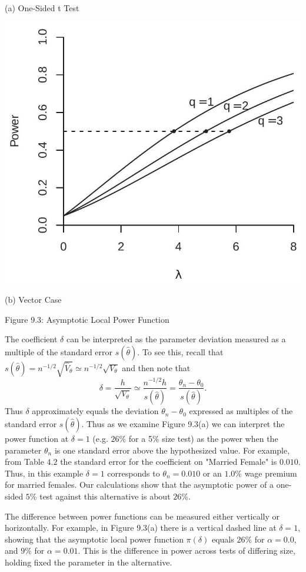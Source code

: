 \documentclass[10pt]{article}
\begin{document}
(a) One-Sided t Test

\includegraphics[max width=\textwidth]{2022_09_17_d22774979aa7978900adg-28(1)}

(b) Vector Case

Figure 9.3: Asymptotic Local Power Function

The coefficient $\delta$ can be interpreted as the parameter deviation measured as a multiple of the standard error $s(\widehat{\theta})$. To see this, recall that $s(\widehat{\theta})=n^{-1 / 2} \sqrt{\widehat{V}_{\theta}} \simeq n^{-1 / 2} \sqrt{V_{\theta}}$ and then note that
$$
\delta=\frac{h}{\sqrt{V_{\theta}}} \simeq \frac{n^{-1 / 2} h}{s(\widehat{\theta})}=\frac{\theta_{n}-\theta_{0}}{s(\widehat{\theta})} .
$$
Thus $\delta$ approximately equals the deviation $\theta_{n}-\theta_{0}$ expressed as multiples of the standard error $s(\widehat{\theta})$. Thus as we examine Figure 9.3(a) we can interpret the power function at $\delta=1$ (e.g. $26 \%$ for a 5\% size test) as the power when the parameter $\theta_{n}$ is one standard error above the hypothesized value. For example, from Table $4.2$ the standard error for the coefficient on "Married Female" is $0.010$. Thus, in this example $\delta=1$ corresponds to $\theta_{n}=0.010$ or an $1.0 \%$ wage premium for married females. Our calculations show that the asymptotic power of a one-sided $5 \%$ test against this alternative is about $26 \%$.

The difference between power functions can be measured either vertically or horizontally. For example, in Figure 9.3(a) there is a vertical dashed line at $\delta=1$, showing that the asymptotic local power function $\pi(\delta)$ equals $26 \%$ for $\alpha=0.0$, and $9 \%$ for $\alpha=0.01$. This is the difference in power across tests of differing size, holding fixed the parameter in the alternative.
\end{document}
